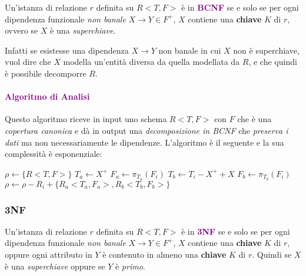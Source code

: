 \begin{definition}[BCNF]
    Un'istanza di relazione $r$ definita su $R<T,F>$ è in \textbf{\textcolor{purple}{BCNF}}
    se e solo se per ogni dipendenza funzionale \emph{non banale} $X \rightarrow Y \in F^+$, $X$
    contiene una \textbf{chiave} $K$ di $r$, ovvero se $X$ è una \emph{superchiave}.

    Infatti se esistesse una dipendenza $X \rightarrow Y$ non banale in cui
    $X$ non è superchiave, vuol dire che $X$ modella un'entità diversa
    da quella modellata da $R$, e che quindi è possibile decomporre $R$.
\end{definition}

\paragraph{\textcolor{purple}{Algoritmo di Analisi}} Questo algoritmo riceve in
input uno schema $R<T,F>$ con $F$ che è una \emph{copertura canonica} e dà in output
una \emph{decomposizione in BCNF} che \emph{preserva i dati} ma non necessariamente le
dipendenze. L'algoritmo è il seguente e la sua complessità è esponenziale:

\begin{algorithm}
    \begin{algorithmic}
        \State $\rho \gets \{R<T,F>\}$
            \State $T_a \gets X^+$
            \State $F_a \gets \pi_{T_a}(F_i)$
            \State $T_b \gets T_i - X^+ + X$
            \State $F_b \gets \pi_{T_b}(F_i)$
            \State $\rho \gets \rho - R_i + \{R_a<T_a,F_a>, R_b<T_b,F_b>\}$
        \EndWhile
    \end{algorithmic}
\end{algorithm}

\subsubsection{3NF}

\begin{definition}[3NF]
    Un'istanza di relazione $r$ definita su $R<T,F>$ è in \textbf{\textcolor{purple}{3NF}}
    se e solo se per ogni dipendenza funzionale \emph{non banale} $X \rightarrow Y \in F^+$, $X$
    contiene una \textbf{chiave} $K$ di $r$, oppure ogni attributo in $Y$ è contenuto in almeno una
    \textbf{chiave} $K$ di $r$. Quindi se $X$ è una \emph{superchiave} oppure
    se $Y$ è \emph{primo}.
\end{definition}

